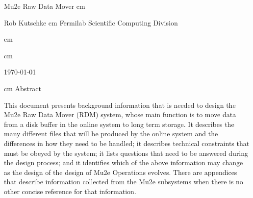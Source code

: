 %
\begin{center}
  {\Huge Mu2e Raw Data Mover}
   cm

  Rob Kutschke
 cm
Fermilab Scientific Computing Division

 cm


%

%

 cm

\today

 cm
Abstract
\end{center}
\medskip

This document presents background information
that is needed to design the Mu2e Raw Data Mover (RDM) system,
whose main function is to move data from a disk buffer
in the online system to long term storage.
It describes the many different files that will be produced by the online system
and the differences in how they need to be handled;
it describes technical constraints that must be obeyed by the system;
it lists questions that need to be answered during the design process;
and it identifies which of the above information may change as the
design of the design of Mu2e Operations evolves.
There are appendices
that describe information collected from the Mu2e subsystems when there
is no other concise reference for that information.
\cleardoublepage
